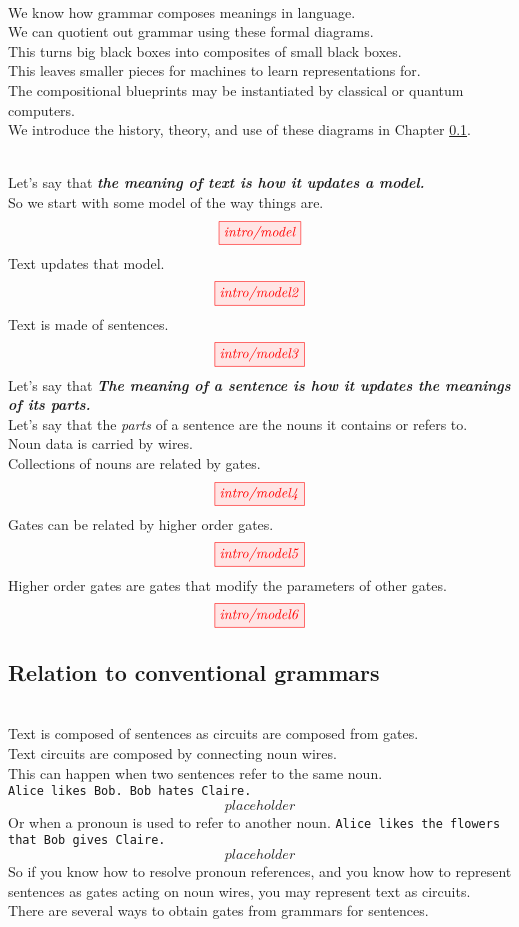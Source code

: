 \begin{fullwidth}
\begin{centering}


\\
We know how grammar composes meanings in language.\\
We can quotient out grammar using these formal diagrams.\\
This turns big black boxes into composites of small black boxes.\\
\[\]
This leaves smaller pieces for machines to learn representations for.\\
The compositional blueprints may be instantiated by classical or quantum computers.\\
We introduce the history, theory, and use of these diagrams in Chapter \ref{}.

\\
Let's say that \textbf\emph{{the meaning of text is how it updates a model.}}\\
So we start with some model of the way things are.
\[\tikzfig{intro/model}\]
Text updates that model.
\[\tikzfig{intro/model2}\]
Text is made of sentences.
\[\tikzfig{intro/model3}\]
Let's say that \textbf{\emph{The meaning of a sentence is how it updates the meanings of its parts.}}\\
Let's say that the \emph{parts} of a sentence are the nouns it contains or refers to.\\
Noun data is carried by wires.\\
Collections of nouns are related by gates.\\
\[\tikzfig{intro/model4}\]
Gates can be related by higher order gates.
\[\tikzfig{intro/model5}\]
Higher order gates are gates that modify the parameters of other gates.
\[\tikzfig{intro/model6}\]

\subsection{Relation to conventional grammars}

\\
Text is composed of sentences as circuits are composed from gates.\\
Text circuits are composed by connecting noun wires.\\
This can happen when two sentences refer to the same noun.\\
\texttt{Alice likes Bob. Bob hates Claire.}\\
\[placeholder\]
Or when a pronoun is used to refer to another noun.
\texttt{Alice likes the flowers that Bob gives Claire.}
\[placeholder\]
So if you know how to resolve pronoun references, and you know how to represent sentences as gates acting on noun wires, you may represent text as circuits.\\
There are several ways to obtain gates from grammars for sentences.\\


\end{centering}
\end{fullwidth}
